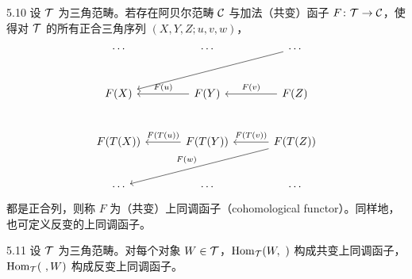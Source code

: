 
\begin{definition}{5.10}
设 $\mathcal{T}$ 为三角范畴。若存在阿贝尔范畴 $\mathcal{C}$ 与加法（共变）函子 $F\colon\mathcal{T}\to\mathcal{C}$，使得对 $\mathcal{T}$ 的所有正合三角序列 $(X,Y,Z;u,v,w)$，
\[
\begin{tikzcd}[row sep=2.6em, column sep=3.2em]
\cdots & \cdots & \cdots \arrow[dll] \\
F(X) & F(Y) \arrow[l,"F(u)"'] & F(Z) \arrow[l,"F(v)"'] \\
F(T(X)) & F(T(Y)) \arrow[l,"F(T(u))"'] & F(T(Z)) \arrow[l,"F(T(v))"'] \arrow[dll,"F(w)"'] \\
\cdots & \cdots & \cdots
\end{tikzcd}
\]
都是正合列，则称 $F$ 为（共变）上同调函子（cohomological functor）。同样地，也可定义反变的上同调函子。
\end{definition}


\begin{lemma}{5.11}
设 $\mathcal{T}$ 为三角范畴。对每个对象 $W\in\mathcal{T}$，$\operatorname{Hom}_{\mathcal{T}}(W,\ )$ 构成共变上同调函子，$\operatorname{Hom}_{\mathcal{T}}(\ ,W)$ 构成反变上同调函子。
\end{lemma}

